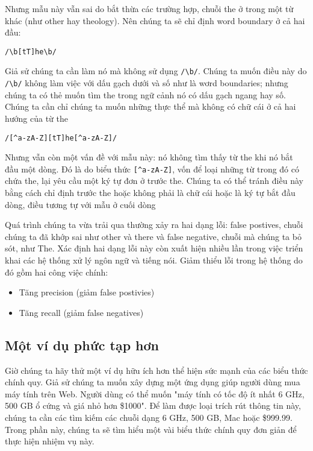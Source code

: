 Nhưng mẫu này vẫn sai do bắt thừa các trường hợp, chuỗi the ở trong một từ khác (như other hay theology). Nên chúng ta sẽ chỉ định word boundary ở cả hai đầu:

\vspace{0.6em}

\noindent \verb|/\b[tT]he\b/|

\vspace{0.6em}

Giả sử chúng ta cần làm nó mà không sử dụng \verb|/\b/|. Chúng ta muốn điều này do \verb|/\b/| không làm việc với dấu gạch dưới và số như là wơrd boundaries; nhưng chúng ta có thẻ muốn tìm the trong ngữ cảnh nó có dấu gạch ngang hay số. Chúng ta cần chỉ chúng ta muốn những thực thể mà không có chữ cái ở cả hai hướng của từ the

\vspace{0.6em}

\noindent \verb|/[^a-zA-Z][tT]he[^a-zA-Z]/|

\vspace{0.6em}

Nhưng vẫn còn một vấn đề với mẫu này: nó không tìm thấy từ the khi nó bắt đầu một dòng. Đó là do biểu thức \verb|[^a-zA-Z]|, vốn để loại những từ trong đó có chứa the, lại yêu cầu một ký tự đơn ở trước the. Chúng ta có thể tránh điều này bằng cách chỉ định trước the hoặc không phải là chữ cái hoặc là ký tự bắt đầu dòng, điều tương tự với mẫu ở cuối dòng


Quá trình chúng ta vừa trải qua thường xảy ra hai dạng lỗi: false postives, chuỗi chúng ta đã khớp sai như other và there và false negative, chuỗi mà chúng ta bỏ sót, như The. Xác định hai dạng lỗi này còn xuất hiện nhiều lần trong việc triển khai các hệ thống xử lý ngôn ngữ và tiếng nói. Giảm thiểu lỗi trong hệ thống do đó gồm hai công việc chính:

\begin{itemize}
  \item Tăng precision (giảm false postivies)
  \item Tăng recall (giảm false negatives)
\end{itemize}

\subsection{Một ví dụ phức tạp hơn}

Giờ chúng ta hãy thử một ví dụ hữu ích hơn thể hiện sức mạnh của các biểu thức chính quy. Giả sử chúng ta muốn xây dựng một ứng dụng giúp người dùng mua máy tính trên Web. Người dùng có thể muốn "máy tính có tốc độ ít nhất 6 GHz, 500 GB ổ cứng và giá nhỏ hơn \$1000". Để làm được loại trích rút thông tin này, chúng ta cần các tìm kiếm các chuỗi dạng 6 GHz, 500 GB, Mac hoặc \$999.99. Trong phần này, chúng ta sẽ tìm hiểu một vài biểu thức chính quy đơn giản để thực hiện nhiệm vụ này.

